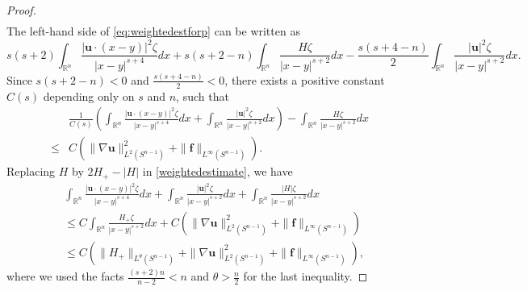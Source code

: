 \documentclass[12pt]{amsart}
\newcommand{\Bu}{{\boldsymbol{u}}}
\newcommand{\Bf}{{\boldsymbol{f}}}
\begin{document}
{\begin{proof}
\begin{align*}
			\end{align*}          
			The left-hand side of \eqref{eq:weightedestforp} can be written as
			\begin{equation*}
				s(s+2)\int_{\mathbb{R}^{n}}\frac{|\Bu\cdot(x-y)|^{2}\zeta}{|x-y|^{s+4}} dx +s(s+2-n)\int_{\mathbb{R}^{n}}\frac{H\zeta}{|x-y|^{s+2}} dx -\frac{s(s+4-n)}{2}\int_{\mathbb{R}^{n}}\frac{|\Bu|^{2}\zeta}{|x-y|^{s+2}} dx .
			\end{equation*}
			Since $s(s+2-n)<0$ and $\frac{s(s+4-n)}{2}<0$, there exists a positive constant $C(s)$ depending only on $s$ and $n$, such that
			\begin{equation}\label{weightedestimate}
				\begin{aligned}
					&\frac{1}{C(s)}\left(\int_{\mathbb{R}^{n}}\frac{|\Bu\cdot(x-y)|^{2}\zeta}{|x-y|^{s+4}} dx +\int_{\mathbb{R}^{n}}\frac{|\Bu|^{2}\zeta}{|x-y|^{s+2}} dx \right)  -\int_{\mathbb{R}^{n}}\frac{H\zeta}{|x-y|^{s+2}}dx
					\\
					\leq &	C\left(\|\nabla \Bu\|_{L^2(S^{n-1})}^2 + \|\Bf\|_{L^\infty(S^{n-1})}\right).
				\end{aligned}
			\end{equation}
			Replacing $H$ by $2H_{+}-|H|$ in \eqref{weightedestimate}, we have
			\begin{align*}
				&\int_{\mathbb{R}^{n}}\frac{|\Bu\cdot(x-y)|^{2}\zeta}{|x-y|^{s+4}} dx +\int_{\mathbb{R}^{n}}\frac{|\Bu|^{2}\zeta}{|x-y|^{s+2}}dx +\int_{\mathbb{R}^{n}}\frac{|H|\zeta}{|x-y|^{s+2}}dx  \\
				& \leq C \int_{\mathbb{R}^n } \frac{H_{+} \zeta}{|x-y|^{s+2} } dx + C \left( \|\nabla \Bu\|_{L^2(S^{n-1}) }^2+\|\Bf\|_{L^{\infty}(S^{n-1})} \right)\\
				&\leq C\left(\|H_{+}\|_{L^{\theta}(S^{n-1}) }+ \|\nabla \Bu\|_{L^2(S^{n-1}) }^2+\|\Bf\|_{L^{\infty}(S^{n-1})} \right),               \end{align*}
			where we used the facts $\frac{(s+2)n}{n-2}<n$ and $\theta>\frac{n}{2}$ for the last inequality.

\end{proof}}
\end{document}
